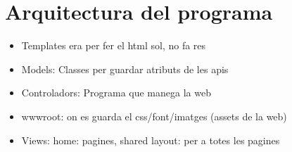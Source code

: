 \section{Arquitectura del programa}

\begin{itemize}
\item{Templates era per fer el html sol, no fa res}
\item{Models: Classes per guardar atributs de les apis}
\item{Controladors: Programa que manega la web}
\item{wwwroot: on es guarda el css/font/imatges (assets de la web)}
\item{Views: home: pagines, shared layout: per a totes les pagines}
\end{itemize}
